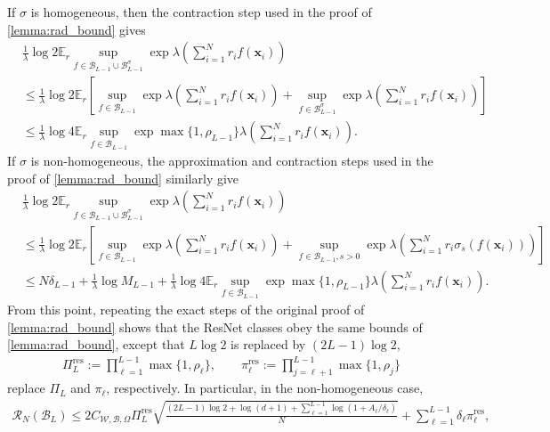 \documentclass{article}
\def\vx{{\bm{x}}}
\def\cB{{\mathcal{B}}}
\def\cR{{\mathcal{R}}}
\def\cW{{\mathcal{W}}}
\def\bE{{\mathbb{E}}}
\begin{document}
\begin{appendices}
    If $\sigma$ is homogeneous, then the contraction step used in the proof of \cref{lemma:rad_bound} gives
    \begin{align}
        &\frac{1}{\lambda} \log 2 \bE_r \sup_{f \in \cB_{L-1} \cup \cB_{L-1}^\sigma} \exp \lambda \left( \sum_{i=1}^N r_i f(\vx_i) \right) \\
        &\leq \frac{1}{\lambda} \log 2 \bE_r \left[ \sup_{f \in \cB_{L-1}} \exp \lambda \left( \sum_{i=1}^N r_i f(\vx_i) \right) + \sup_{f \in \cB_{L-1}^\sigma} \exp \lambda \left( \sum_{i=1}^N r_i f(\vx_i) \right) \right] \\
        &\leq \frac{1}{\lambda} \log 4 \bE_r \sup_{f \in \cB_{L-1}} \exp \max\{1,\rho_{L-1}\} \lambda \left( \sum_{i=1}^N r_i f(\vx_i) \right). \label{eq:resnet_rad_bound_post_contraction_homogeneous_final}
    \end{align}
    If $\sigma$ is non-homogeneous, the approximation and contraction steps used in the proof of \cref{lemma:rad_bound} similarly give
    \begin{align}
        &\frac{1}{\lambda} \log 2 \bE_r \sup_{f \in \cB_{L-1} \cup \cB_{L-1}^\sigma} \exp \lambda \left( \sum_{i=1}^N r_i f(\vx_i) \right) \\
        &\leq \frac{1}{\lambda} \log 2 \bE_r \left[ \sup_{f \in \cB_{L-1}} \exp \lambda \left( \sum_{i=1}^N r_i f(\vx_i) \right) + \sup_{f \in \cB_{L-1},s>0} \exp \lambda \left( \sum_{i=1}^N r_i \sigma_s(f(\vx_i)) \right) \right] \\
        &\leq N \delta_{L-1} + \frac{1}{\lambda} \log M_{L-1} + \frac{1}{\lambda} \log 4 \bE_r \sup_{f \in \cB_{L-1}} \exp \max\{1,\rho_{L-1}\} \lambda \left( \sum_{i=1}^N r_i f(\vx_i) \right). \label{eq:resnet_rad_bound_post_contraction_nonhomogeneous_final}
    \end{align}
    From this point, repeating the exact steps of the original proof of \cref{lemma:rad_bound} shows that the ResNet classes obey the same bounds of \cref{lemma:rad_bound}, except that $L \log 2$ is replaced by $(2L-1) \log 2$,
    \begin{align}
        \Pi_L^{\mathrm{res}} := \prod_{\ell=1}^{L-1} \max\{1, \rho_\ell \}, \qquad \pi_\ell^{\mathrm{res}} := \prod_{j=\ell+1}^{L-1} \max\{1, \rho_j \}
    \end{align}
    replace $\Pi_L$ and $\pi_\ell$, respectively. In particular, in the non-homogeneous case,
    \begin{align}
        \cR_N(\cB_L) \leq 2 C_{\cW, \cB,\Omega} \Pi_L^{\mathrm{res}} \sqrt{\frac{(2L-1) \log 2 + \log(d+1) + \sum_{\ell=1}^{L-1} \log (1+A_\ell/\delta_\ell)}{N}} + \sum_{\ell=1}^{L-1} \delta_{\ell} \pi_\ell^{\mathrm{res}},

\end{align}
\end{appendices}
\end{document}
